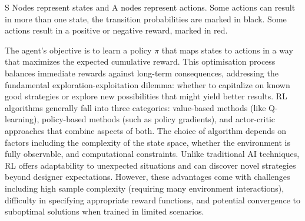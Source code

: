 S Nodes represent states and A nodes represent actions. 
Some actions can result in more than one state, the transition probabilities are marked in black. 
Some actions result in a positive or negative reward, marked in red.

The agent's objective is to learn a policy $\pi$ that maps states to actions in a way that maximizes the expected cumulative reward. 
This optimisation process balances immediate rewards against long-term consequences, addressing the fundamental exploration-exploitation dilemma: whether to capitalize on known good strategies or explore new possibilities that might yield better results.
RL algorithms generally fall into three categories: value-based methods (like Q-learning), policy-based methods (such as policy gradients), and actor-critic approaches that combine aspects of both. 
The choice of algorithm depends on factors including the complexity of the state space, whether the environment is fully observable, and computational constraints.
Unlike traditional AI techniques, RL offers adaptability to unexpected situations and can discover novel strategies beyond designer expectations. 
However, these advantages come with challenges including high sample complexity (requiring many environment interactions), difficulty in specifying appropriate reward functions, and potential convergence to suboptimal solutions when trained in limited scenarios.

